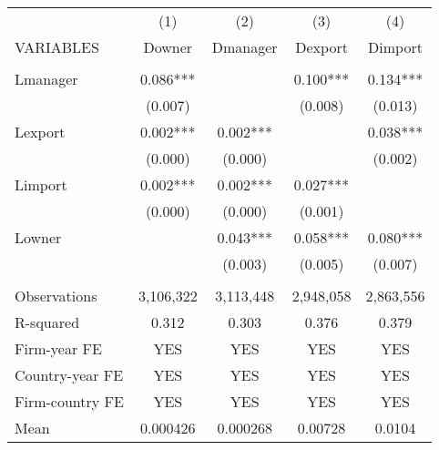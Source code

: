 \begin{tabular}{lcccc} \hline
 & (1) & (2) & (3) & (4) \\
VARIABLES & Downer & Dmanager & Dexport & Dimport \\ \hline
 &  &  &  &  \\
Lmanager & 0.086*** &  & 0.100*** & 0.134*** \\
 & (0.007) &  & (0.008) & (0.013) \\
Lexport & 0.002*** & 0.002*** &  & 0.038*** \\
 & (0.000) & (0.000) &  & (0.002) \\
Limport & 0.002*** & 0.002*** & 0.027*** &  \\
 & (0.000) & (0.000) & (0.001) &  \\
Lowner &  & 0.043*** & 0.058*** & 0.080*** \\
 &  & (0.003) & (0.005) & (0.007) \\
 &  &  &  &  \\
Observations & 3,106,322 & 3,113,448 & 2,948,058 & 2,863,556 \\
R-squared & 0.312 & 0.303 & 0.376 & 0.379 \\
Firm-year FE & YES & YES & YES & YES \\
Country-year FE & YES & YES & YES & YES \\
Firm-country FE & YES & YES & YES & YES \\
 Mean & 0.000426 & 0.000268 & 0.00728 & 0.0104 \\ \hline
\end{tabular}
